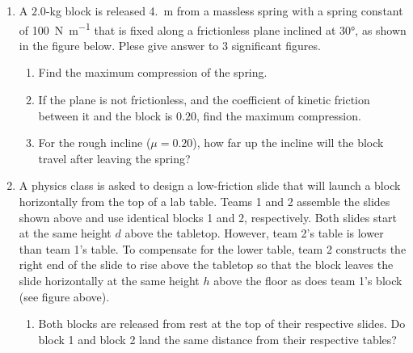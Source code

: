 \documentclass{../../../oss-apphys}
\begin{document}
\begin{enumerate}[leftmargin=15pt]
\item A $2.0$-\si{\kilo\gram} block is released \SI{4.}{\metre} from a massless
  spring with a spring constant of \SI{100}{\newton\per\metre} that is fixed
  along a frictionless plane inclined at \ang{30}, as shown in the figure below.
  Plese give answer to $3$ significant figures.
  \begin{center}
  \end{center}
  \begin{enumerate}[noitemsep,leftmargin=20pt]
  \item Find the maximum compression of the spring.
  \item If the plane is not frictionless, and the coefficient of kinetic
    friction between it and the block is $0.20$, find the maximum compression.
  \item For the rough incline ($\mu=0.20$), how far up the incline will the
    block travel after leaving the spring?
  \end{enumerate}
  \newpage

  \begin{center}
  \end{center}
\item A physics class is asked to design a low-friction slide that will launch
  a block horizontally from the top of a lab table. Teams 1 and 2 assemble the
  slides shown above and use identical blocks 1 and 2, respectively. Both
  slides start at the same height $d$ above the tabletop. However, team 2's
  table is lower than team 1's table. To compensate for the lower table, team 2
  constructs the right end of the slide to rise above the tabletop so that the
  block leaves the slide horizontally at the same height $h$ above the floor as
  does team 1's block (see figure above).
  \begin{enumerate}[nosep,leftmargin=20pt]
  \item Both blocks are released from rest at the top of their respective
    slides. Do block 1 and block 2 land the same distance from their respective
    tables?


\end{enumerate}
\end{enumerate}
\end{document}
